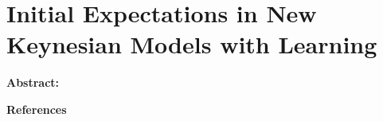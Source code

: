 \chapter{Initial Expectations in New Keynesian Models with Learning}

\noindent \textbf{Abstract:}



\newpage
\noindent\large\textbf{References}\vspace{-5pc}\normalsize

\newpage

